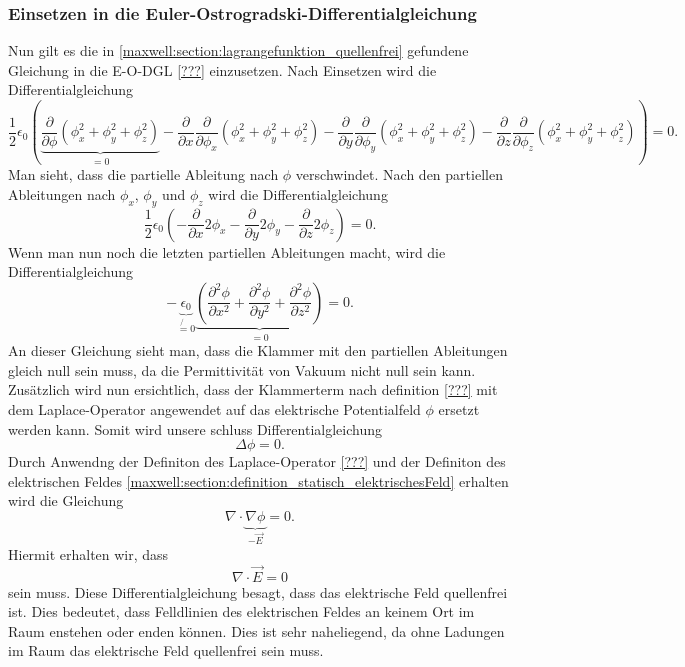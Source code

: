 \subsubsection{Einsetzen in die Euler-Ostrogradski-Differentialgleichung}
Nun gilt es die in \eqref{maxwell:section:lagrangefunktion_quellenfrei} gefundene Gleichung in die E-O-DGL \ref{???} einzusetzen.
Nach Einsetzen wird die Differentialgleichung
\[
\frac{1}{2}\epsilon_0\left(\underbrace{\frac{\partial}{\partial\phi}\left(\phi_x^2 + \phi_y^2 + \phi_z^2\right)}_{=0} - \frac{\partial}{\partial x}\frac{\partial}{\partial \phi_x}\left(\phi_x^2 + \phi_y^2 + \phi_z^2\right) - 
\frac{\partial}{\partial y}\frac{\partial}{\partial \phi_y}\left(\phi_x^2 + \phi_y^2 + \phi_z^2\right) - 
\frac{\partial}{\partial z}\frac{\partial}{\partial \phi_z}\left(\phi_x^2 + \phi_y^2 + \phi_z^2\right)\right)
=
0.
\]
Man sieht, dass die partielle Ableitung nach $\phi$ verschwindet.
Nach den partiellen Ableitungen nach $\phi_x$, $\phi_y$ und $\phi_z$ wird die Differentialgleichung
\[
\frac{1}{2}\epsilon_0\left(-\frac{\partial}{\partial x}2\phi_x - \frac{\partial}{\partial y}2\phi_y - \frac{\partial}{\partial z}2\phi_z\right)
=
0.
\]
Wenn man nun noch die letzten partiellen Ableitungen macht, wird die Differentialgleichung
\begin{equation}
	- \underbrace{\epsilon_0}_{\not{=}0}\underbrace{\left(\frac{\partial^2\phi}{\partial x^2} + \frac{\partial^2\phi}{\partial y^2} + \frac{\partial^2\phi}{\partial z^2}\right)}_{=0}
	=
	0.
	\label{maxwell:section:laplace_gleichung_1}
\end{equation}
An dieser Gleichung sieht man, dass die Klammer mit den partiellen Ableitungen gleich null sein muss, da die Permittivität von Vakuum nicht null sein kann.
Zusätzlich wird nun ersichtlich, dass der Klammerterm nach definition \ref{???} mit dem Laplace-Operator angewendet auf das elektrische Potentialfeld $\phi$ ersetzt werden kann.
Somit wird unsere schluss Differentialgleichung
\begin{equation}
	\Delta\phi
	=
	0.
	\label{maxwell:section:laplace_gleichung_2}
\end{equation}
Durch Anwendng der Definiton des Laplace-Operator \ref{???} und der Definiton des elektrischen Feldes \eqref{maxwell:section:definition_statisch_elektrischesFeld} erhalten wird die Gleichung
\[
\nabla\cdot\underbrace{\nabla\phi}_{-\vec{E}}
=
0.
\]
Hiermit erhalten wir, dass
\begin{equation}
	\nabla\cdot\vec{E}
	=
	0
	\label{maxwell:section:e_feld_quellenfrei}
\end{equation}
sein muss. Diese Differentialgleichung besagt, dass das elektrische Feld quellenfrei ist.
Dies bedeutet, dass Felldlinien des elektrischen Feldes an keinem Ort im Raum enstehen oder enden können.
Dies ist sehr naheliegend, da ohne Ladungen im Raum das elektrische Feld quellenfrei sein muss.

